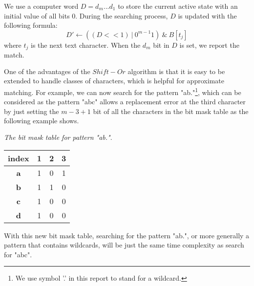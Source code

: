 We use a computer word $D = d_m...d_1$ to store the current active state with an initial value of all bits 0. During the searching process, $D$ is updated with the following formula: 
$$D' \leftarrow ((D << 1) \ | \ 0^{m-1}1) \ \& \ B[t_j]$$
where $t_j$ is the next text character.  When the $d_m$ bit in $D$ is set, we report the match. 

One of the advantages of the $Shift-Or$ algorithm is that it is easy to be extended to handle classes of characters, which is helpful for approximate matching. 
For example, we can now search for the pattern "ab."\footnote{ We use symbol '.' in this report to stand for a wildcard.}, which can be considered as the pattern "abc" allows a replacement error at the third character by just setting the $m-3+1$ bit of all the characters in the bit mask table as the following example shows. 

\begin{example}\emph{The bit mask table for pattern "ab."}.
	\begin{table}[H]
		\centering
		\begin{tabular}{|c|c|c|c|}
			\hline
			index      & 1                        & 2                        & 3                        \\ \hline
			\textbf{a} & {\color{red} 1}                   & 0                        & {\color[HTML]{3531FF} 1} \\ \hline
			\textbf{b} &  {\color{red} 1}                    & {\color[HTML]{3531FF} 1} & 0                        \\ \hline
			\textbf{c} & {\color[HTML]{3531FF} 1} & 0                        & 0                        \\ \hline
			\textbf{d} &{\color{red} 1}                    & 0                        & 0                        \\ \hline
		\end{tabular}
		\label{table-bitmask2}
	\end{table}
\end{example}

With this new bit mask table, searching for the pattern "ab.", or more generally a pattern that contains wildcards, will be just the same time complexity as search for "abc". 
 
